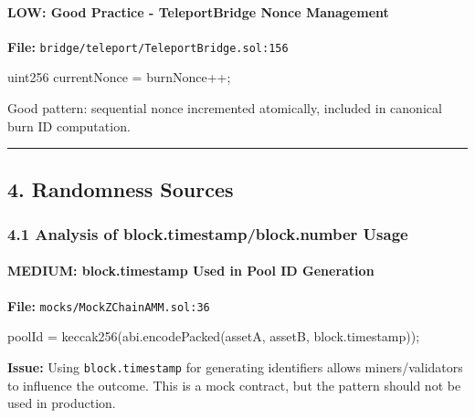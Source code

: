 \documentclass[
]{article}
\newenvironment{Shaded}{}{}
\newcommand{\NormalTok}[1]{#1}
\begin{document}
\paragraph{LOW: Good Practice - TeleportBridge Nonce
Management}\label{low-good-practice---teleportbridge-nonce-management}

\textbf{File:} \texttt{bridge/teleport/TeleportBridge.sol:156}

\begin{Shaded}
\begin{Highlighting}[]
\NormalTok{uint256 currentNonce = burnNonce++;}
\end{Highlighting}
\end{Shaded}

Good pattern: sequential nonce incremented atomically, included in
canonical burn ID computation.

\begin{center}\rule{0.5\linewidth}{0.5pt}\end{center}

\subsection{4. Randomness Sources}\label{4-randomness-sources}

\subsubsection{4.1 Analysis of block.timestamp/block.number
Usage}\label{41-analysis-of-blocktimestampblocknumber-usage}

\paragraph{MEDIUM: block.timestamp Used in Pool ID
Generation}\label{medium-blocktimestamp-used-in-pool-id-generation}

\textbf{File:} \texttt{mocks/MockZChainAMM.sol:36}

\begin{Shaded}
\begin{Highlighting}[]
\NormalTok{poolId = keccak256(abi.encodePacked(assetA, assetB, block.timestamp));}
\end{Highlighting}
\end{Shaded}

\textbf{Issue:} Using \texttt{block.timestamp} for generating
identifiers allows miners/validators to influence the outcome. This is a
mock contract, but the pattern should not be used in production.
\end{document}
